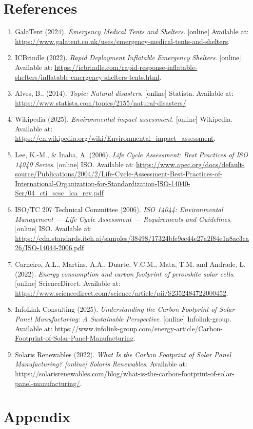 \documentclass{article}
\begin{document}
\section{References}
\normalsize
\begin{enumerate}
\item GalaTent (2024). \textit{Emergency Medical Tents and Shelters}. [online] Available at: \url{https://www.galatent.co.uk/uses/emergency-medical-tents-and-shelters}.
\item ICBrindle (2022). \textit{Rapid Deployment Inflatable Emergency Shelters}. [online] Available at: \url{https://icbrindle.com/rapid-response-inflatable-shelters/inflatable-emergency-shelters-tents.html}.
\item Alves, B., (2014). \textit{Topic: Natural disasters}. [online] Statista. Available at: \url{https://www.statista.com/topics/2155/natural-disasters/}
\item Wikipedia (2025). \textit{Environmental impact assessment}. [online] Wikipedia. Available at: \url{https://en.wikipedia.org/wiki/Environmental_impact_assessment}.
\item Lee, K.-M., \& Inaba, A. (2006). \textit{Life Cycle Assessment: Best Practices of ISO 14040 Series}. [online] ISO. Available at: \url{https://www.apec.org/docs/default-source/Publications/2004/2/Life-Cycle-Assessment-Best-Practices-of-International-Organization-for-Standardization-ISO-14040-Ser/04_cti_scsc_lca_rev.pdf}
\item ISO/TC 207 Technical Committee (2006). \textit{ISO 14044: Environmental Management — Life Cycle Assessment — Requirements and Guidelines}. [online] ISO. Available at: \url{https://cdn.standards.iteh.ai/samples/38498/17324bfe9ec44e27a2f84e1a8ac3ca26/ISO-14044-2006.pdf}
\item Carneiro, A.L., Martins, A.A., Duarte, V.C.M., Mata, T.M. and Andrade, L. (2022). \textit{Energy consumption and carbon footprint of perovskite solar cells}. [online] ScienceDirect. Available at:  \url{https://www.sciencedirect.com/science/article/pii/S2352484722000452}.
‌\item InfoLink Consulting (2025). \textit{Understanding the Carbon Footprint of Solar Panel Manufacturing: A Sustainable Perspective}. [online] Infolink-group. Available at: \url{https://www.infolink-group.com/energy-article/Carbon-Footprint-of-Solar-Panel-Manufacturing}.
\item Solaris Renewables (2022). \textit{What Is the Carbon Footprint of Solar Panel Manufacturing? [online] Solaris Renewables}. Available at: \url{https://solarisrenewables.com/blog/what-is-the-carbon-footprint-of-solar-panel-manufacturing/}.
\end{enumerate}

\newpage

\section{Appendix}

	
\end{document}
